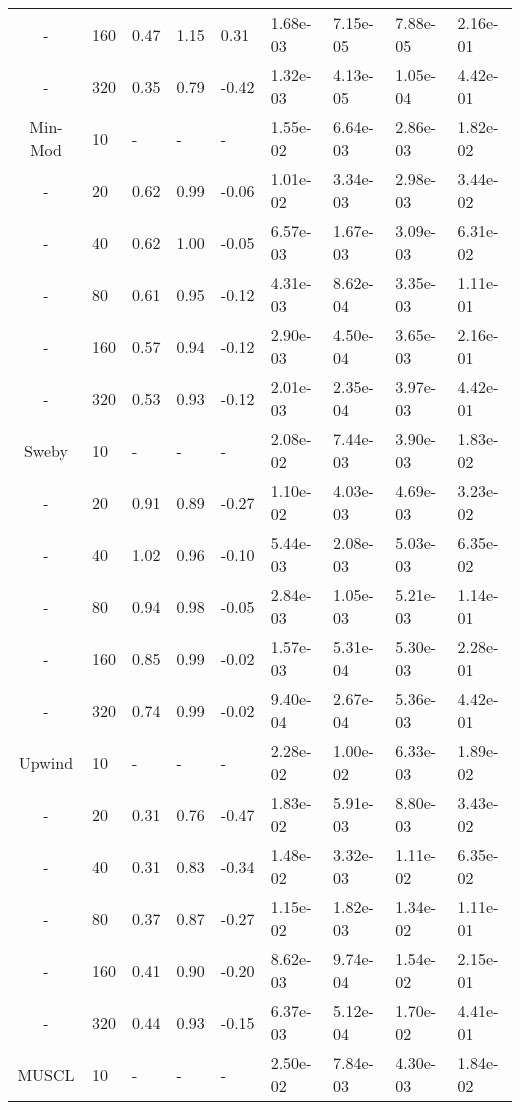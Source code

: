 \begin{table}[h]
{\begin{tabular}{cllllllll}
    - &  160 & 0.47 & 1.15 & 0.31 & 1.68e-03 & 7.15e-05 & 7.88e-05 & 2.16e-01  \\
    - &  320 & 0.35 & 0.79 & -0.42 & 1.32e-03 & 4.13e-05 & 1.05e-04 & 4.42e-01 \\ 
   \hline
    Min-Mod &   10 & - & - & - & 1.55e-02 & 6.64e-03 & 2.86e-03 & 1.82e-02  \\
    - &   20 & 0.62 & 0.99 & -0.06 & 1.01e-02 & 3.34e-03 & 2.98e-03 & 3.44e-02 \\ 
    - &   40 & 0.62 & 1.00 & -0.05 & 6.57e-03 & 1.67e-03 & 3.09e-03 & 6.31e-02 \\ 
    - &   80 & 0.61 & 0.95 & -0.12 & 4.31e-03 & 8.62e-04 & 3.35e-03 & 1.11e-01 \\ 
    - &  160 & 0.57 & 0.94 & -0.12 & 2.90e-03 & 4.50e-04 & 3.65e-03 & 2.16e-01 \\ 
    - &  320 & 0.53 & 0.93 & -0.12 & 2.01e-03 & 2.35e-04 & 3.97e-03 & 4.42e-01 \\ 
   \hline
    Sweby &   10 & - & - & - & 2.08e-02 & 7.44e-03 & 3.90e-03 & 1.83e-02  \\
    - &   20 & 0.91 & 0.89 & -0.27 & 1.10e-02 & 4.03e-03 & 4.69e-03 & 3.23e-02 \\ 
    - &   40 & 1.02 & 0.96 & -0.10 & 5.44e-03 & 2.08e-03 & 5.03e-03 & 6.35e-02 \\ 
    - &   80 & 0.94 & 0.98 & -0.05 & 2.84e-03 & 1.05e-03 & 5.21e-03 & 1.14e-01 \\ 
    - &  160 & 0.85 & 0.99 & -0.02 & 1.57e-03 & 5.31e-04 & 5.30e-03 & 2.28e-01 \\ 
    - &  320 & 0.74 & 0.99 & -0.02 & 9.40e-04 & 2.67e-04 & 5.36e-03 & 4.42e-01 \\ 
   \hline
    Upwind &   10 & - & - & - & 2.28e-02 & 1.00e-02 & 6.33e-03 & 1.89e-02  \\
    - &   20 & 0.31 & 0.76 & -0.47 & 1.83e-02 & 5.91e-03 & 8.80e-03 & 3.43e-02 \\ 
    - &   40 & 0.31 & 0.83 & -0.34 & 1.48e-02 & 3.32e-03 & 1.11e-02 & 6.35e-02 \\ 
    - &   80 & 0.37 & 0.87 & -0.27 & 1.15e-02 & 1.82e-03 & 1.34e-02 & 1.11e-01 \\ 
    - &  160 & 0.41 & 0.90 & -0.20 & 8.62e-03 & 9.74e-04 & 1.54e-02 & 2.15e-01 \\ 
    - &  320 & 0.44 & 0.93 & -0.15 & 6.37e-03 & 5.12e-04 & 1.70e-02 & 4.41e-01 \\ 
   \hline
    MUSCL &   10 & - & - & - & 2.50e-02 & 7.84e-03 & 4.30e-03 & 1.84e-02  \\

\end{tabular}}
\end{table}
